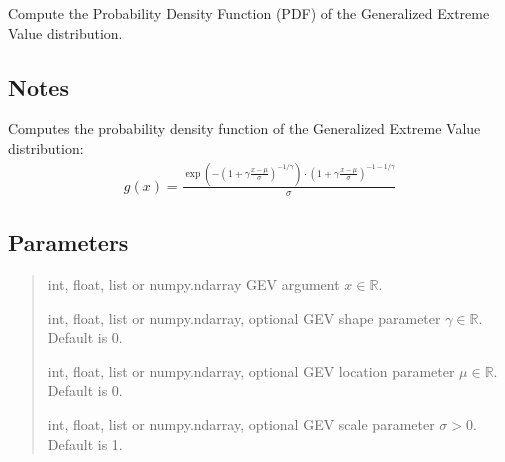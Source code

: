 \documentclass[a4paper,11pt,openany,english]{sphinxmanual}
\begin{document}
\begin{fulllineitems}
\label{\detokenize{api_misc:xtremes.miscellaneous.GEV_pdf}}
\pysigstartsignatures
{}
\pysigstopsignatures
\sphinxAtStartPar
Compute the Probability Density Function (PDF) of the Generalized Extreme Value distribution.


\subsection{Notes}
\label{\detokenize{api_misc:id9}}
\sphinxAtStartPar
Computes the probability density function of the Generalized Extreme Value distribution:
\begin{equation*}
\begin{split}g(x) = \frac{\exp\left(-\left(1+\gamma \frac{x-\mu}{\sigma}\right)^{-1/\gamma}\right)\cdot
        \left(1+\gamma \frac{x-\mu}{\sigma}\right)^{-1-1/\gamma}}{\sigma}\end{split}
\end{equation*}

\subsection{Parameters}
\label{\detokenize{api_misc:id10}}\begin{quote}\begin{description}
\sphinxAtStartPar
int, float, list or numpy.ndarray
GEV argument \(x\in \mathbb{R}\).

\sphinxAtStartPar
int, float, list or numpy.ndarray, optional
GEV shape parameter \(\gamma\in \mathbb{R}\). Default is 0.

\sphinxAtStartPar
int, float, list or numpy.ndarray, optional
GEV location parameter \(\mu\in \mathbb{R}\). Default is 0.

\sphinxAtStartPar
int, float, list or numpy.ndarray, optional
GEV scale parameter \(\sigma>0\). Default is 1.

\end{description}\end{quote}



\end{fulllineitems}
\end{document}
